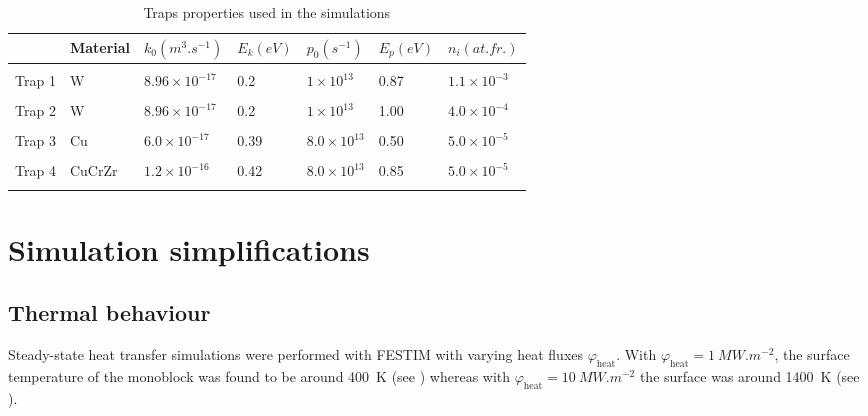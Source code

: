 \begin{table}
    \centering
    \begin{tabular}{L{1.5cm} L{1.5cm} R{1.7cm} R{1.1cm} R{1.6cm} R{1.1cm} R{1.9cm}}
         & Material & $k_0 (\si{m^3.s^{-1}})$ &  $E_k (\si{eV})$ & $p_0 (\si{s^{-1}})$ & $E_p (\si{eV})$ & $n_i (\si{at.fr.})$ \\
        \hline
        \\
        Trap 1 & W & $8.96 \times 10^{-17}$ & 0.2 & $1 \times 10^{13}$& 0.87 & $1.1 \times 10^{-3}$ \\
        \\
        Trap 2 & W & $8.96 \times 10^{-17}$ & 0.2 & $1 \times 10^{13}$& 1.00 & $4.0 \times 10^{-4}$ \\
        \\
        Trap 3 & Cu & $6.0 \times 10^{-17}$ & 0.39 & $8.0 \times 10^{13}$ & 0.50 &$5.0 \times 10^{-5}$\\
        \\
        Trap 4 & CuCrZr & $1.2\times 10^{-16}$ & 0.42 & $8.0 \times 10^{13}$ & 0.85 &$5.0 \times 10^{-5}$\\
        \\
    \end{tabular}
    \caption{Traps properties used in the simulations \cite{hodille_macroscopic_2015, dolan_assessment_1994}}
\end{table}

\section{Simulation simplifications}

\subsection{Thermal behaviour}
Steady-state heat transfer simulations were performed with FESTIM with varying heat fluxes $\varphi_\mathrm{heat}$.
With $\varphi_\mathrm{heat} = \SI{1}{MW.m^{-2}}$, the surface temperature of the monoblock was found to be around \SI{400}{K} (see ) whereas with $\varphi_\mathrm{heat} = \SI{10}{MW.m^{-2}}$ the surface was around \SI{1400}{K} (see ).

